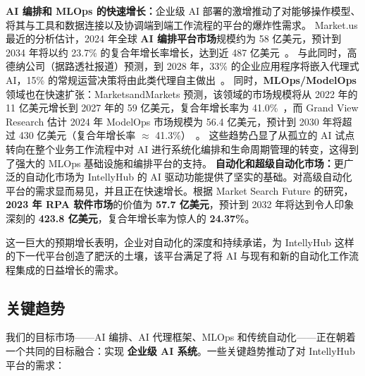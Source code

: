 \documentclass[11pt, a4paper, oneside]{article}
\begin{document}
\textbf{AI 编排和 MLOps 的快速增长：}企业级 AI 部署的激增推动了对能够操作模型、将其与工具和数据连接以及协调端到端工作流程的平台的爆炸性需求。
Market.us 最近的分析估计，2024 年全球 \textbf{AI 编排平台市场}规模约为 58 亿美元，预计到 2034 年将以约 23.7\% 的复合年增长率增长，达到近 487 亿美元~\cite{AIOrch}。
与此同时，高德纳公司（据路透社报道）预测，到 2028 年，33\% 的企业应用程序将嵌入代理式 AI，15\% 的常规运营决策将由此类代理自主做出~\cite{GartnerAgentic}。
同时，\textbf{MLOps/ModelOps} 领域也在快速扩张：MarketsandMarkets 预测，该领域的市场规模将从 2022 年的 11 亿美元增长到 2027 年的 59 亿美元，复合年增长率为 41.0\%~\cite{MLOpsMM}，而 Grand View Research 估计 2024 年 ModelOps 市场规模为 56.4 亿美元，预计到 2030 年将超过 430 亿美元（复合年增长率 $\approx$ 41.3\%）~\cite{ModelOpsGV}。
这些趋势凸显了从孤立的 AI 试点转向在整个业务工作流程中对 AI 进行系统化编排和生命周期管理的转变，这得到了强大的 MLOps 基础设施和编排平台的支持。\newline\newline
\textbf{自动化和超级自动化市场：}更广泛的自动化市场为 IntellyHub 的 AI 驱动功能提供了坚实的基础。对高级自动化平台的需求显而易见，并且正在快速增长。根据 Market Search Future 的研究，\textbf{2023 年 RPA 软件市场}的价值为 \textbf{57.7 亿美元}，预计到 2032 年将达到令人印象深刻的 \textbf{423.8 亿美元}，复合年增长率为惊人的 \textbf{24.37\%}\cite{mrfRPA}。

这一巨大的预期增长表明，企业对自动化的深度和持续承诺，为 IntellyHub 这样的下一代平台创造了肥沃的土壤，该平台满足了将 AI 与现有和新的自动化工作流程集成的日益增长的需求。

\subsection{关键趋势}

我们的目标市场——AI 编排、AI 代理框架、MLOps 和传统自动化——正在朝着一个共同的目标融合：实现 \textbf{企业级 AI 系统}。一些关键趋势推动了对 IntellyHub 平台的需求：
\end{document}
